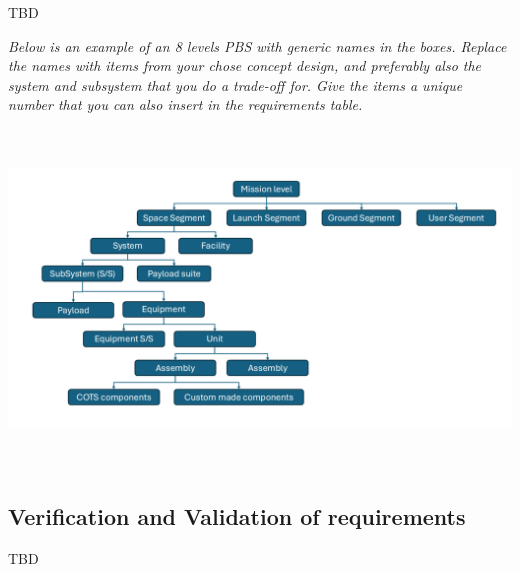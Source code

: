\documentclass[../main.tex]{subfiles}
\begin{document}
\restoregeometry
\newpage

TBD

\emph{Below is an example of an 8 levels PBS with generic names in the
boxes. Replace the names with items from your chose concept design, and
preferably also the system and subsystem that you do a trade-off for.
Give the items a unique number that you can also insert in the
requirements table.}

\includegraphics[width=6.28264in,height=3.53403in]{media/Product Breakdown Structure.png}

\subsection{Verification and Validation of
requirements}\label{verification-and-validation}

TBD
\end{document}
